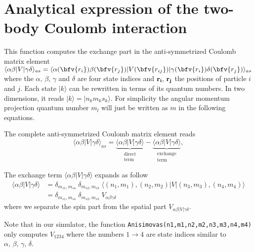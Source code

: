 \chapter{Analytical expression of the two-body Coulomb interaction}
\label{app:rontani} 
This function computes the exchange part in the anti-symmetrized Coulomb matrix element $\langle \alpha \beta |V|\gamma \delta \rangle_{as}=\langle \alpha(\bfv{r_{i}}) \beta(\bfv{r_{j}}) |V(\bfv{r_{ij}})| \gamma(\bfv{r_{i}})  \delta(\bfv{r_{j}}) \rangle_{as}$ where the $\alpha, \, \beta,\, \gamma$ and $\delta$ are four state indices and $\bf{r_i}, \, \bf{r_j}$ the positions of particle $i$ and $j$.
Each state $|k \rangle$ can be rewritten in terms of its quantum numbers. In two dimensions, it reads $|k \rangle=|n_k m_k s_k \rangle$. For simplicity the angular momentum projection quantum number $m_l$ will just be written as $m$ in the following equations.

The complete anti-symmetrized Coulomb matrix element reads
\begin{equation}
\langle \alpha \beta |V|\gamma \delta \rangle_{as} =  \underbrace{\langle \alpha \beta |V|\gamma \delta \rangle}_{\begin{smallmatrix}
  \text{direct} \\
  \text{term}
\end{smallmatrix}} - \underbrace{\langle \alpha \beta |V|\gamma \delta \rangle}_{\begin{smallmatrix}
  \text{exchange} \\
  \text{term}
\end{smallmatrix}},
\end{equation} 

The exchange term $ \langle \alpha \beta |V|\gamma \delta \rangle$ expands as follow
\begin{align}
\langle \alpha \beta |V|\gamma \delta \rangle &= \delta_{m_{s1},m_{s4}} \; \delta_{m_{s2},m_{s3}} \; \langle (n_1,m_1),(n_2,m_2) | V | (n_3,m_3),(n_4,m_4) \rangle\\
&= \delta_{m_{s1},m_{s4}} \; \delta_{m_{s2},m_{s3}} \;  V_{\alpha \beta \gamma \delta}
\end{align} 
where we separate the spin part from the spatial part $V_{\alpha \beta |V|\gamma \delta}$.

Note that in our simulator, the function \texttt{Anisimovas(n1,m1,n2,m2,n3,m3,n4,m4)} only computes  $V_{1234}$ where the numbers $1\rightarrow4$ are state indices similar to $\alpha,\, \beta,\, \gamma, \, \delta$.

